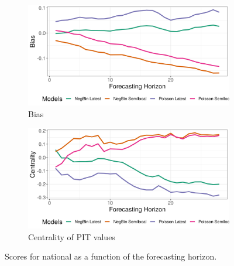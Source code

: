 \begin{figure}[H]
\begin{subfigure}{0.5\textwidth}
  \centering
  \includegraphics[width=\linewidth]{../output/national_bias.png}  
  \caption{Bias}
  \label{fig:national_scores_3}
\end{subfigure}
\begin{subfigure}{0.5\textwidth}
  \centering
  \includegraphics[width=\linewidth]{../output/national_centrality.png}  
  \caption{Centrality of PIT values}
  \label{fig:national_scores_4}
\end{subfigure}
  \caption{Scores for national as a function of the forecasting horizon.}

  \label{fig:nat_scores}
\end{figure}
